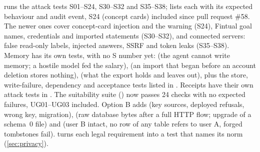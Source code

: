  runs the attack tests S01--S24, S30--S32 and S35--S38;  lists each
with its expected behaviour and audit event, S24 (concept cards) included since pull request \#58. The newer ones cover
concept-card injection and the  warning (S24), Fintual goal names, credentials and imported
statements (S30--S32), and connected servers: false read-only labels, injected answers, SSRF and token leaks
(S35--S38). Memory has its own tests, with no S number yet:  (the agent
cannot write memory; a hostile model fed the salary),  (an import that
began before an account deletion stores nothing),  (what the export holds and
leaves out), plus the store, write-failure, dependency and acceptance tests listed in . Receipts have their own attack tests in . The suitability suite
() now passes 24 checks with no expected failures, UG01--UG03 included. Option B adds  (key sources, deployed refusals, wrong key,
migration),  (raw database bytes after a full HTTP flow; upgrade of a
schema~0 file) and  (user B intact, no row of any table refers to user A,
forged tombstones fail).  turns each legal requirement into a test that names
its norm (\cref{sec:privacy}).
